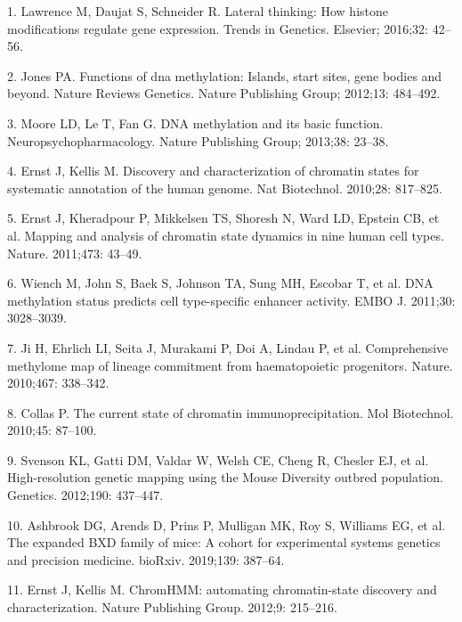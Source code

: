 \documentclass[10pt,letterpaper]{article}
\newenvironment{cslreferences}%
  {}%
  {\par}
\begin{document}
\hypertarget{refs}{}
\begin{cslreferences}
\leavevmode\hypertarget{ref-lawrence2016lateral}{}%
1. Lawrence M, Daujat S, Schneider R. Lateral thinking: How histone
modifications regulate gene expression. Trends in Genetics. Elsevier;
2016;32: 42--56.

\leavevmode\hypertarget{ref-jones2012functions}{}%
2. Jones PA. Functions of dna methylation: Islands, start sites, gene
bodies and beyond. Nature Reviews Genetics. Nature Publishing Group;
2012;13: 484--492.

\leavevmode\hypertarget{ref-moore2013dna}{}%
3. Moore LD, Le T, Fan G. DNA methylation and its basic function.
Neuropsychopharmacology. Nature Publishing Group; 2013;38: 23--38.

\leavevmode\hypertarget{ref-pmid20657582}{}%
4. Ernst J, Kellis M. Discovery and characterization of chromatin states
for systematic annotation of the human genome. Nat Biotechnol. 2010;28:
817--825.

\leavevmode\hypertarget{ref-pmid21441907}{}%
5. Ernst J, Kheradpour P, Mikkelsen TS, Shoresh N, Ward LD, Epstein CB,
et al. Mapping and analysis of chromatin state dynamics in nine human
cell types. Nature. 2011;473: 43--49.

\leavevmode\hypertarget{ref-pmid21701563}{}%
6. Wiench M, John S, Baek S, Johnson TA, Sung MH, Escobar T, et al. DNA
methylation status predicts cell type-specific enhancer activity. EMBO
J. 2011;30: 3028--3039.

\leavevmode\hypertarget{ref-pmid20720541}{}%
7. Ji H, Ehrlich LI, Seita J, Murakami P, Doi A, Lindau P, et al.
Comprehensive methylome map of lineage commitment from haematopoietic
progenitors. Nature. 2010;467: 338--342.

\leavevmode\hypertarget{ref-pmid20077036}{}%
8. Collas P. The current state of chromatin immunoprecipitation. Mol
Biotechnol. 2010;45: 87--100.

\leavevmode\hypertarget{ref-Svenson:2012hq}{}%
9. Svenson KL, Gatti DM, Valdar W, Welsh CE, Cheng R, Chesler EJ, et al.
High-resolution genetic mapping using the Mouse Diversity outbred
population. Genetics. 2012;190: 437--447.

\leavevmode\hypertarget{ref-Ashbrook:2019bd}{}%
10. Ashbrook DG, Arends D, Prins P, Mulligan MK, Roy S, Williams EG, et
al. The expanded BXD family of mice: A cohort for experimental systems
genetics and precision medicine. bioRxiv. 2019;139: 387--64.

\leavevmode\hypertarget{ref-Ernst:2012ii}{}%
11. Ernst J, Kellis M. ChromHMM: automating chromatin-state discovery
and characterization. Nature Publishing Group. 2012;9: 215--216.


\end{cslreferences}
\end{document}
